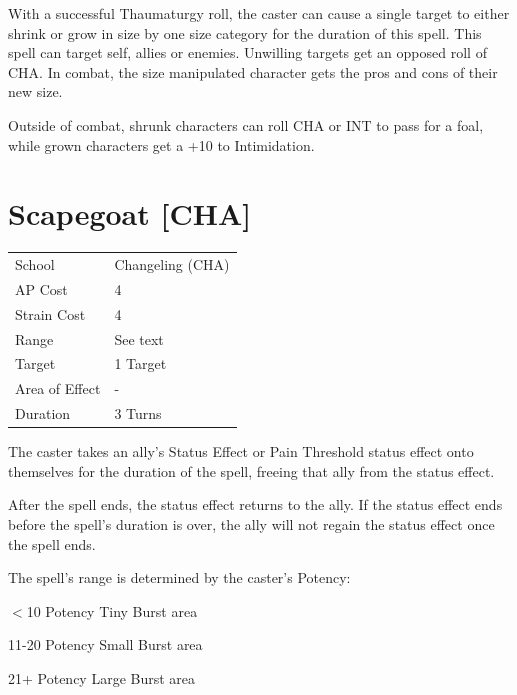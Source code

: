 \documentclass[11pt,a4paper,twocolumn]{book}
\begin{document}
	\medskip
	
	With a successful Thaumaturgy roll, the caster can cause a single target to either shrink or grow in size by one size category for the duration of this spell. This spell can target self, allies or enemies. Unwilling targets get an opposed roll of CHA. In combat, the size manipulated character gets the pros and cons of their new size.
	
	Outside of combat, shrunk characters can roll CHA or INT to pass for a foal, while grown characters get a +10 to Intimidation.
	
	\vfill
	
	\pagebreak

	\section*{Scapegoat [CHA]}
	{
		\begin{tabu} to 75mm{| X[l,4] | X[l,7] |}
			\hline
			School 			&  Changeling (CHA)\\
			AP Cost	      	&  4				\\
			Strain Cost     &  4				\\
			Range     		&  See text			\\
			Target      	&  1 Target			\\
			Area of Effect  &  -	 			\\
			Duration     	&  3 Turns			\\ \hline
		\end{tabu}
		
	}
	
	\medskip
	
	The caster takes an ally's Status Effect or Pain Threshold status effect onto themselves for the duration of the spell, freeing that ally from the status effect.
	
	After the spell ends, the status effect returns to the ally. If the status effect ends before the spell's duration is over, the ally will not regain the status effect once the spell ends.
	
	The spell's range is determined by the caster's Potency:
	
	\begin{compactitem}
		\item $<$10 Potency 		Tiny Burst area
		\item 11-20 Potency 		Small Burst area
		\item 21+ Potency 			Large Burst area
	\end{compactitem}
	
\end{document}
